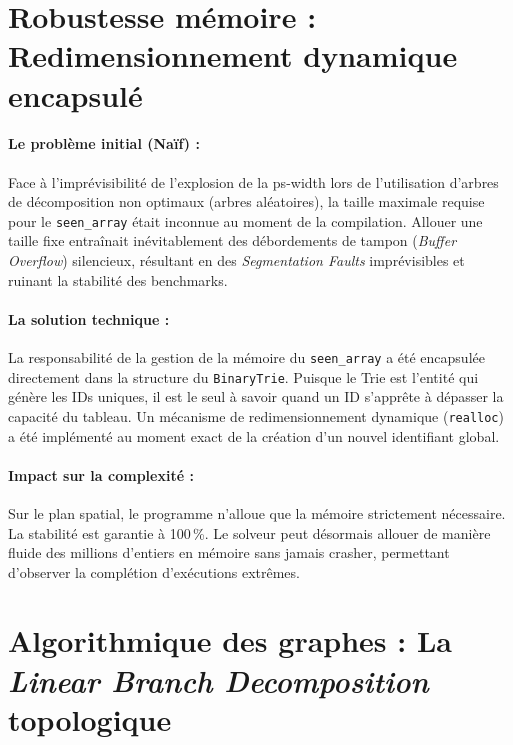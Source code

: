\documentclass[11pt,a4paper]{report}
\begin{document}
\section*{Robustesse mémoire : Redimensionnement dynamique encapsulé}

\paragraph{Le problème initial (Naïf) :}
Face à l'imprévisibilité de l'explosion de la ps-width lors de l'utilisation d'arbres de décomposition non optimaux (arbres aléatoires), la taille maximale requise pour le \texttt{seen\_array} était inconnue au moment de la compilation. Allouer une taille fixe entraînait inévitablement des débordements de tampon (\textit{Buffer Overflow}) silencieux, résultant en des \textit{Segmentation Faults} imprévisibles et ruinant la stabilité des benchmarks.

\paragraph{La solution technique :}
La responsabilité de la gestion de la mémoire du \texttt{seen\_array} a été encapsulée directement dans la structure du \texttt{BinaryTrie}. Puisque le Trie est l'entité qui génère les IDs uniques, il est le seul à savoir quand un ID s'apprête à dépasser la capacité du tableau. Un mécanisme de redimensionnement dynamique (\texttt{realloc}) a été implémenté au moment exact de la création d'un nouvel identifiant global.

\paragraph{Impact sur la complexité :}
Sur le plan spatial, le programme n'alloue que la mémoire strictement nécessaire. La stabilité est garantie à 100\,\%. Le solveur peut désormais allouer de manière fluide des millions d'entiers en mémoire sans jamais crasher, permettant d'observer la complétion d'exécutions extrêmes.

\section*{Algorithmique des graphes : La \textit{Linear Branch Decomposition} topologique}
\end{document}
